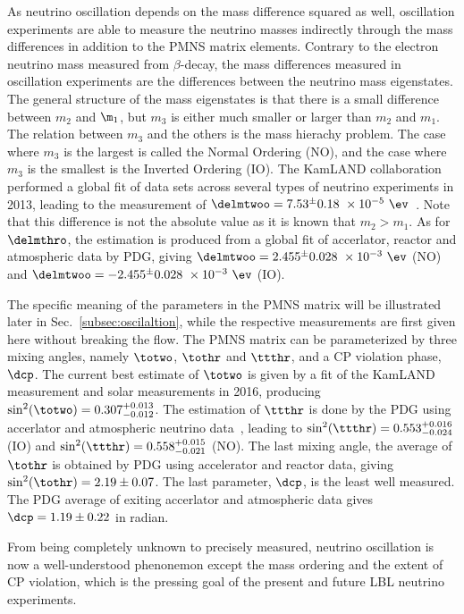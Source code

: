 As neutrino oscillation depends on the mass difference squared as well, oscillation experiments are able to measure the neutrino masses indirectly through the mass differences in addition to the PMNS matrix elements.
Contrary to the electron neutrino mass measured from $\beta$-decay, the mass differences measured in oscillation experiments are the differences between the neutrino mass eigenstates.
The general structure of the mass eigenstates is that there is a small difference between $m_2$ and $\m_1$, but $m_3$ is either much smaller or larger than $m_2$ and $m_1$.
The relation between $m_3$ and the others is the mass hierachy problem.
The case where $m_3$ is the largest is called the Normal Ordering (NO), and the case where $m_3$ is the smallest is the Inverted Ordering (IO).
The KamLAND collaboration performed a global fit of data sets across several types of neutrino experiments in 2013, leading to the measurement of $\delmtwoo=7.53^\pm0.18~\times 10^{-5}~\ev$~\cite{KamLAND:2013rgu}.
Note that this difference is not the absolute value as it is known that $m_2>m_1$.
As for $\delmthro$, the estimation is produced from a global fit of accerlator, reactor and atmospheric data by PDG, giving $\delmtwoo=2.455^\pm0.028~\times 10^{-3}~\ev$ (NO) and $\delmtwoo=-2.455^\pm0.028~\times 10^{-3}~\ev$ (IO).

The specific meaning of the parameters in the PMNS matrix will be illustrated later in Sec.~\ref{subsec:oscilaltion}, while the respective measurements are first given here without breaking the flow.
The PMNS matrix can be parameterized by three mixing angles, namely $\totwo$, $\tothr$ and $\ttthr$, and a CP violation phase, $\dcp$.
The current best estimate of $\totwo$ is given by a fit of the KamLAND measurement and solar measurements in 2016, producing $\sin^2(\totwo)=0.307^{+0.013}_{-0.012}$.
The estimation of $\ttthr$ is done by the PDG using accerlator and atmospheric neutrino data~\cite{ParticleDataGroup:2024cfk}, leading to $\sin^2(\ttthr)=0.553^{+0.016}_{-0.024}$ (IO) and $\sin^2(\ttthr)=0.558^{+0.015}_{-0.021}$ (NO).
The last mixing angle, the average of $\tothr$ is obtained by PDG using accelerator and reactor data, giving $\sin^2(\tothr)=2.19\pm0.07$.
The last parameter, $\dcp$, is the least well measured.
The PDG average of exiting accerlator and atmospheric data gives $\dcp=1.19\pm0.22$ in radian.

From being completely unknown to precisely measured, neutrino oscillation is now a well-understood phenonemon except the mass ordering and the extent of CP violation, which is the pressing goal of the present and future LBL neutrino experiments.
 
